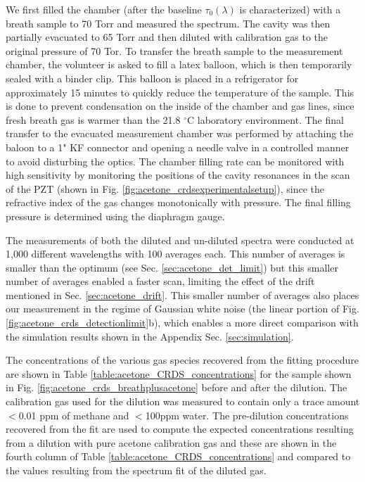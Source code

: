 \documentclass[12pt]{report}
\begin{document}
	We first filled the chamber (after the baseline $\tau_0(\lambda)$ is characterized) with a breath sample to 70 Torr and measured the spectrum. The cavity was then partially evacuated to 65 Torr and then diluted with calibration gas to the original pressure of 70 Tor. To transfer the breath sample to the measurement chamber, the volunteer is asked to fill a latex balloon, which is then temporarily sealed with a binder clip. This balloon is placed in a refrigerator for approximately 15 minutes to quickly reduce the temperature of the sample. This is done to prevent condensation on the inside of the chamber and gas lines, since fresh breath gas is warmer than the 21.8 $^\circ$C laboratory environment. The final transfer to the evacuated measurement chamber was performed by attaching the baloon to a 1" KF connector and opening a needle valve in a controlled manner to avoid disturbing the optics. The chamber filling rate can be monitored with high sensitivity by monitoring the positions of the cavity resonances in the scan of the PZT (shown in Fig. \ref{fig:acetone_crdsexperimentalsetup}), since the refractive index of the gas changes monotonically with pressure. The final filling pressure is determined using the diaphragm gauge.
	
	The measurements of both the diluted and un-diluted spectra were conducted at 1,000 different wavelengths with 100 averages each. This number of averages is smaller than the optimum (see Sec. \ref{sec:acetone_det_limit}) but this smaller number of averages enabled a faster scan, limiting the effect of the drift mentioned in Sec. \ref{sec:acetone_drift}. This smaller number of averages also places our measurement in the regime of Gaussian white noise (the linear portion of Fig. \ref{fig:acetone_crds_detectionlimit}b), which enables a more direct comparison with the simulation results shown in the Appendix Sec. \ref{sec:simulation}.
	
	The concentrations of the various gas species recovered from the fitting procedure are shown in Table \ref{table:acetone_CRDS_concentrations} for the sample shown in Fig. \ref{fig:acetone_crds_breathplusacetone} before and after the dilution. The calibration gas used for the dilution was measured to contain only a trace amount $<$0.01 ppm of methane and $<$100ppm water. The pre-dilution concentrations recovered from the fit are used to compute the expected concentrations resulting from a dilution with pure acetone calibration gas and these are shown in the fourth column of Table \ref{table:acetone_CRDS_concentrations} and compared to the values resulting from the spectrum fit of the diluted gas.
	
\end{document}
